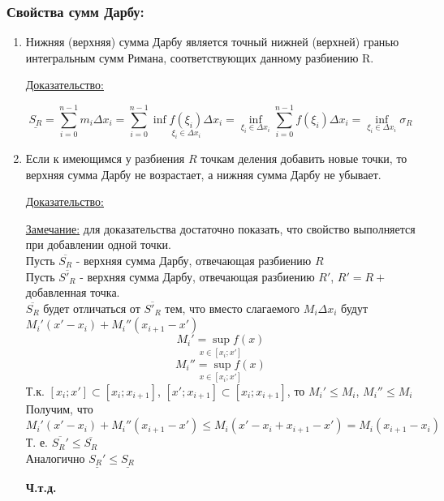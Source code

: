 \documentclass[12pt]{article}
\begin{document}
    \subsubsection*{Свойства сумм Дарбу:}
    \begin{enumerate}
        \item Нижняя (верхняя) сумма Дарбу является точный нижней (верхней) гранью интегральным сумм Римана, соответствующих данному разбиению R.\par\noindent
        \underline{Доказательство:}
        \begin{adjustwidth}{1.5em}{1.5em}
            \[ \underline{S_R} = \sum_{i = 0}^{n-1} m_i \Delta x_i = \sum_{i = 0}^{n - 1}\underset{\xi_i \in \Delta x_i}{\inf f(\xi_i)\Delta x_i} = \underset{\xi_i \in \Delta x_i}{\inf} \sum_{i = 0}^{n - 1} f(\xi_i)\Delta x_i = \underset{\xi_i \in \Delta x_i}{\inf} \sigma_R\]
        \end{adjustwidth}
        \item Если к имеющимся у разбиения $R$ точкам деления добавить новые точки, то верхняя сумма Дарбу не возрастает, а нижняя сумма Дарбу не убывает.\par\noindent
        \underline{Доказательство:}
        \begin{adjustwidth}{1.5em}{1.5em}
            \underline{Замечание:} для доказательства достаточно показать, что свойство выполняется при добавлении одной точки.\\
            Пусть $\overline{S_R}$ - верхняя сумма Дарбу, отвечающая разбиению $R$\\
            Пусть $\overline{S'_R}$ - верхняя сумма Дарбу, отвечающая разбиению $R'$, $R'=R+$добавленная точка.\\
            $\overline{S_R}$ будет отличаться от $\overline{S'_R}$ тем, что вместо слагаемого $M_i \Delta x_i$ будут $M_i'(x'-x_i)+M_i''(x_{i+1}-x')$
            \[\underset{x \in [x_i;x']}{M_i' = \sup f(x)}\]
            \[ \underset{x \in [x_i;x']}{M_i''= \sup f(x)}\]
            Т.к. $[x_i; x'] \subset [x_i; x_{i+1}]$, $[x'; x_{i+1}] \subset [x_i; x_{i+1}]$, то $M_i' \leq M_i$, $M_i''\leq M_i$\\
            Получим, что $M_i'(x'-x_i)+M_i''(x_{i+1}-x') \leq M_i(x'-x_i+x_{i+1}-x') = M_i(x_{i+1}-x_i)$\\
            Т. е. $\overline{S_R'} \leq \overline{S_R}$\\
            Аналогично $\underline{S_R'} \leq \underline{S_R}$
            \begin{center}
                \textbf{Ч.т.д.}

\end{center}
\end{adjustwidth}
\end{enumerate}
\end{document}
